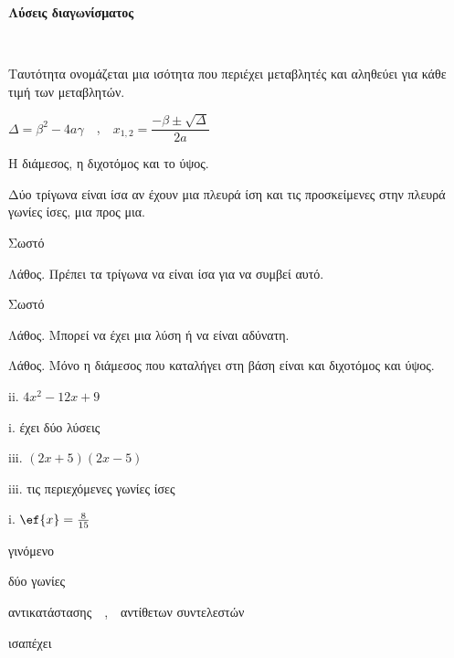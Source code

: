 \documentclass[twoside,nofonts,internet,math,spyros]{frontisthrio-diag}
\begin{document}
\begin{center}
{\Large \textbf{Λύσεις διαγωνίσματος}}
\end{center}
\begin{thema}
\item\mbox{}\\\vspace{-5mm}
\begin{erwthma}
\item 
\begin{alist}
\item Ταυτότητα ονομάζεται μια ισότητα που περιέχει μεταβλητές και αληθεύει για κάθε τιμή των μεταβλητών.
\item $ \varDelta=\beta^2-4a\gamma $\ \ ,\ \ $ x_{1,2}=\dfrac{-\beta\pm\sqrt{\varDelta}}{2a} $
\item Η διάμεσος, η διχοτόμος και το ύψος.
\item Δύο τρίγωνα είναι ίσα αν έχουν μια πλευρά ίση και τις προσκείμενες στην πλευρά γωνίες ίσες, μια προς μια.
\end{alist}
\item 
\begin{alist}
\item Σωστό
\item Λάθος. Πρέπει τα τρίγωνα να είναι ίσα για να συμβεί αυτό.
\item Σωστό
\item Λάθος. Μπορεί να έχει μια λύση ή να είναι αδύνατη.
\item Λάθος. Μόνο η διάμεσος που καταλήγει στη βάση είναι και διχοτόμος και ύψος.
\end{alist}
\item 
\begin{multicols}{2}
\begin{alist}
\item ii. $ 4x^2-12x+9 $
\item i. έχει δύο λύσεις
\item iii. $ (2x+5)(2x-5) $
\item iii. τις περιεχόμενες γωνίες ίσες
\item i. $ \ef{x}=\frac{8}{15} $
\end{alist}
\end{multicols}
\item 
\begin{alist}
\item γινόμενο
\item δύο γωνίες
\item αντικατάστασης\ \ ,\ \ αντίθετων συντελεστών
\item ισαπέχει

\end{alist}
\end{erwthma}
\end{thema}
\end{document}
